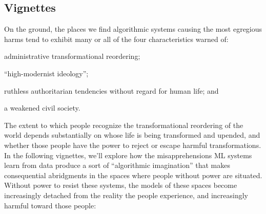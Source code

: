 \documentclass[manuscript,screen]{acmart}
\begin{document}
\subsection{Vignettes}

On the ground, the places we find algorithmic systems causing the most egregious harms tend to exhibit many or all of the four characteristics \citeauthor{scott1998seeing} warned of: 
\begin{enumerate*}

\item administrative transformational reordering;


\item ``high-modernist ideology'';


\item ruthless authoritarian tendencies without regard for human life;
and 

\item a weakened civil society.
\end{enumerate*}
The extent to which people recognize the transformational reordering of the world depends substantially on whose life is being transformed and upended, and whether those people have the power to reject or escape harmful transformations.
In the following vignettes, we'll explore how the misapprehensions ML systems learn from data produce a sort of ``algorithmic imagination'' that makes consequential abridgments in the spaces where people without power are situated.
Without power to resist these systems, the models of these spaces become increasingly detached from the reality the people experience, and increasingly harmful toward those people:
\end{document}
